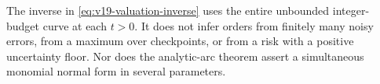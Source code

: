 The inverse in \eqref{eq:v19-valuation-inverse} uses the entire
unbounded integer-budget curve at each $t>0$. It does not infer
orders from finitely many noisy errors, from a maximum over
checkpoints, or from a risk with a positive uncertainty floor.
Nor does the analytic-arc theorem assert a simultaneous monomial
normal form in several parameters.

